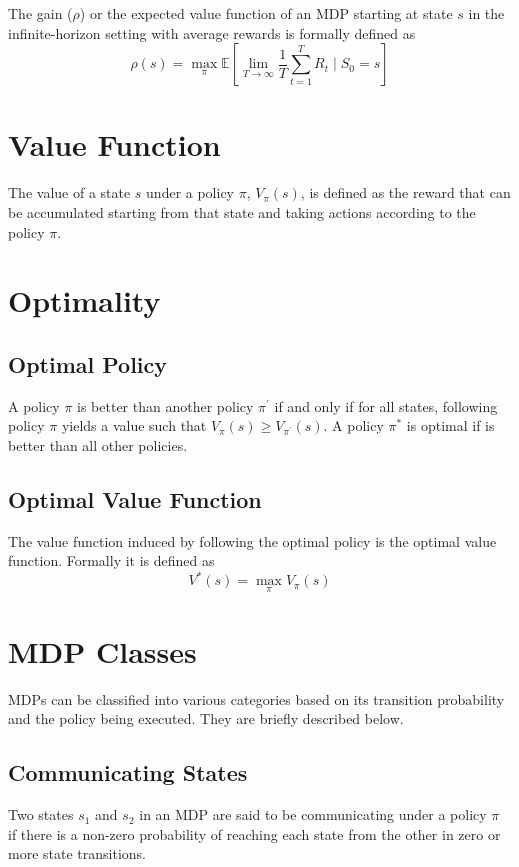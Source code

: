The gain ($\rho$) or the expected value function of an MDP starting at state $s$ in the infinite-horizon setting with average rewards is formally defined as
$$\rho(s) = \max_\pi \mathbb{E}\left[\lim_{T \to \infty} \frac{1}{T} \sum_{t=1}^{T} R_t \mid S_0 = s\right]$$

\section{Value Function}

The value of a state $s$ under a policy $\pi$, $V_\pi(s)$, is defined as the reward that can be accumulated starting from that state and taking actions according to the policy $\pi$. 

\section{Optimality}

\subsection{Optimal Policy}

A policy $\pi$ is better than another policy $\pi^\prime$ if and only if for all states, following policy $\pi$ yields a value such that $V_\pi(s) \ge V_{\pi^\prime} (s)$.
A policy $\pi^*$ is optimal if is better than all other policies.

\subsection{Optimal Value Function}

The value function induced by following the optimal policy is the optimal value function. Formally it is defined as
$$V^*(s) = \max_\pi V_\pi(s)$$

\section{MDP Classes}

MDPs can be classified into various categories based on its transition probability and the policy being executed. They are briefly described below.

\subsection{Communicating States}

Two states $s_1$ and $s_2$ in an MDP are said to be communicating under a policy $\pi$ if there is a non-zero probability of reaching each state from the other in zero or more state transitions.

